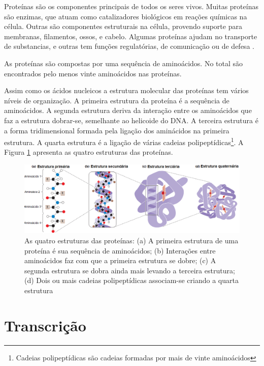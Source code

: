 Proteínas são os componentes principais de todos os seres vivos. Muitas proteínas são enzimas, que atuam como catalizadores biológicos em reações químicas na célula. Outras são componentes estruturais na célula, provendo suporte para membranas, filamentos, ossos, e cabelo. Algumas proteínas ajudam no transporte de substancias, e outras tem funções regulatórias, de comunicação ou de defesa \cite{Pierce2012}.

As proteínas são compostas por uma sequência de aminoácidos. No total são encontrados pelo menos vinte aminoácidos nas proteínas.

Assim como os ácidos nucleicos a estrutura molecular das proteínas tem vários níveis de organização. A primeira estrutura da proteína é a sequência de aminoácidos. A segunda estrutura deriva da interação entre os aminoácidos que faz a estrutura dobrar-se, semelhante ao helicoide do DNA. A terceira estrutura é a forma tridimensional formada pela ligação dos aminácidos na primeira estrutura. A quarta estrutura é a ligação de várias cadeias polipeptídicas\footnote{Cadeias polipeptídicas são cadeias formadas por mais de vinte aminoácidos}. A Figura \ref{fig:estrutura_Proteinas} apresenta as quatro estruturas das proteínas.

\begin{figure}[H]
    \centering
    \includegraphics[scale=0.5]{./figuras/estrutura_Proteinas.png}
    \caption{As quatro estruturas das proteínas: (a) A primeira estrutura de uma proteína é sua sequência de aminoácidos; (b) Interações entre aminoácidos faz com que a primeira estrutura se dobre; (c) A segunda estrutura se dobra ainda mais levando a terceira estrutura; (d) Dois ou mais cadeias polipeptídicas associam-se criando a quarta estrutura \cite[Adaptada]{Pierce2012}}
    \label{fig:estrutura_Proteinas}
\end{figure}

\section{Transcrição}\label{trans}

